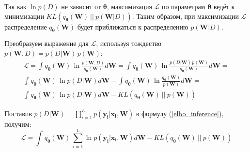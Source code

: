 \documentclass{article}
\numberwithin{equation}{section}
\begin{document}
    Так как $\ln{p(D)}$ не зависит от $\pmb{\theta}$,
    максимизация $\mathcal{L}$ по параметрам $\pmb{\theta}$
    ведёт к минимизации
    $KL(q_{\pmb{\theta}}(\pmb{W})~||~p(\pmb{W}| D))$.
    Таким образом, при максимизации $\mathcal{L}$
    распределение $q_{\pmb{\theta}}(\pmb{W})$
    будет приближаться к распределению $p(\pmb{W}| D)$.

    Преобразуем выражение для $\mathcal{L}$, используя тождество $p(\pmb{W}, D) = p(D | \pmb{W}) \, p(\pmb{W})$:
    \begin{equation}\label{elbo_inference}
    \begin{split}
        \mathcal{L}
        =
            \int_{}{
                q_{\pmb{\theta}}(\pmb{W})
                \,
                \ln{
                    \frac
                        {p(\pmb{W}, D)}
                        {q_{\pmb{\theta}}(\pmb{W})}
                }
                d\pmb{W}
            }
        =
            \int_{}{
                q_{\pmb{\theta}}(\pmb{W})
                \,
                \ln{
                    \frac
                        {
                            p(D | \pmb{W})
                            \,
                            p(\pmb{W})
                        }
                        {q_{\pmb{\theta}}(\pmb{W})}
                }
                d\pmb{W}
            }
        = \\
            \int_{}{
                q_{\pmb{\theta}}(\pmb{W})
                \,
                \ln{
                    p(D | \pmb{W})
                }
                d\pmb{W}
            }
            -
            \int_{}{
                q_{\pmb{\theta}}(\pmb{W})
                \,
                \ln{
                    \frac
                        {q_{\pmb{\theta}}(\pmb{W})}
                        {p(\pmb{W})}
                }
                d\pmb{W}
            }
        = \\
            \int_{}{
                q_{\pmb{\theta}}(\pmb{W})
                \,
                \ln{
                    p(D | \pmb{W})
                }
                d\pmb{W}
            }
            -
            KL(
                q_{\pmb{\theta}}(\pmb{W})~||~p(\pmb{W})
            )
    \end{split}
    \end{equation}

    Поставив
    $
        p(D | \pmb{W})
        =
        \prod_{i=1}^{L}{
            p(\pmb{y_i} | \pmb{x_i}, \pmb{W})
        }
    $
    в формулу (\ref{elbo_inference}), получим:
    \begin{equation}
        \mathcal{L}
        =
            \int_{}{
                q_{\pmb{\theta}}(\pmb{W})
                \,
                \sum_{i=1}^{L}{
                    \ln{
                        p(\pmb{y_{i}} | \pmb{x_{i}}, \pmb{W})
                    }
                }
                d\pmb{W}
            }
            -
            KL(
                q_{\pmb{\theta}}(\pmb{W})~||~p(\pmb{W})
            )
    \end{equation}
\end{document}
